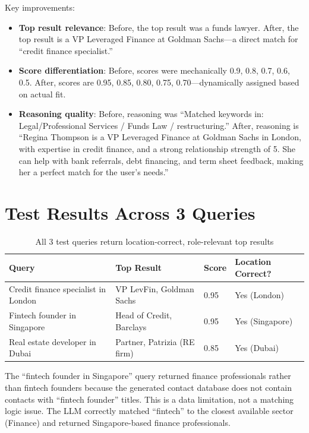 \documentclass[12pt, a4paper]{report}
\begin{document}
Key improvements:
\begin{itemize}[itemsep=3pt]
    \item \textbf{Top result relevance}: Before, the top result was a funds lawyer. After, the top result is a VP Leveraged Finance at Goldman Sachs---a direct match for ``credit finance specialist.''
    \item \textbf{Score differentiation}: Before, scores were mechanically 0.9, 0.8, 0.7, 0.6, 0.5. After, scores are 0.95, 0.85, 0.80, 0.75, 0.70---dynamically assigned based on actual fit.
    \item \textbf{Reasoning quality}: Before, reasoning was ``Matched keywords in: Legal/Professional Services / Funds Law / restructuring.'' After, reasoning is ``Regina Thompson is a VP Leveraged Finance at Goldman Sachs in London, with expertise in credit finance, and a strong relationship strength of 5. She can help with bank referrals, debt financing, and term sheet feedback, making her a perfect match for the user's needs.''
\end{itemize}

\section{Test Results Across 3 Queries}

\begin{table}[H]
\centering
\begin{tabular}{p{5cm}p{2.5cm}p{2.5cm}p{2.5cm}}
\toprule
\textbf{Query} & \textbf{Top Result} & \textbf{Score} & \textbf{Location Correct?} \\
\midrule
Credit finance specialist in London & VP LevFin, Goldman Sachs & 0.95 & Yes (London) \\
Fintech founder in Singapore & Head of Credit, Barclays & 0.95 & Yes (Singapore) \\
Real estate developer in Dubai & Partner, Patrizia (RE firm) & 0.85 & Yes (Dubai) \\
\bottomrule
\end{tabular}
\caption{All 3 test queries return location-correct, role-relevant top results}
\end{table}

The ``fintech founder in Singapore'' query returned finance professionals rather than fintech founders because the generated contact database does not contain contacts with ``fintech founder'' titles. This is a data limitation, not a matching logic issue. The LLM correctly matched ``fintech'' to the closest available sector (Finance) and returned Singapore-based finance professionals.
\end{document}
